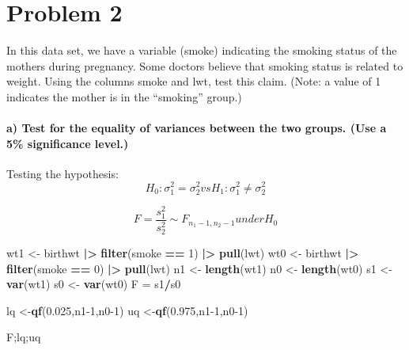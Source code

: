 \documentclass[
]{article}
\newenvironment{Shaded}{\begin{snugshade}}{\end{snugshade}}
\newcommand{\DecValTok}[1]{\textcolor[rgb]{0.00,0.00,0.81}{#1}}
\newcommand{\FloatTok}[1]{\textcolor[rgb]{0.00,0.00,0.81}{#1}}
\newcommand{\FunctionTok}[1]{\textcolor[rgb]{0.13,0.29,0.53}{\textbf{#1}}}
\newcommand{\NormalTok}[1]{#1}
\newcommand{\OtherTok}[1]{\textcolor[rgb]{0.56,0.35,0.01}{#1}}
\newcommand{\SpecialCharTok}[1]{\textcolor[rgb]{0.81,0.36,0.00}{\textbf{#1}}}
\begin{document}
\hypertarget{problem-2}{%
\section{Problem 2}\label{problem-2}}

In this data set, we have a variable (smoke) indicating the smoking
status of the mothers during pregnancy. Some doctors believe that
smoking status is related to weight. Using the columns smoke and lwt,
test this claim. (Note: a value of 1 indicates the mother is in the
``smoking'' group.)

\hypertarget{a-test-for-the-equality-of-variances-between-the-two-groups.-use-a-5-significance-level.}{%
\paragraph{a) Test for the equality of variances between the two groups.
(Use a 5\% significance
level.)}\label{a-test-for-the-equality-of-variances-between-the-two-groups.-use-a-5-significance-level.}}

Testing the hypothesis:
\[H_0 : \sigma_1^2 = \sigma_2^2   vs   H_1 : \sigma_1^2 \neq \sigma_2^2\]

\[F =\frac{s_1^2}{s_2^2}\sim F_{n_1-1,n_2-1}   under H_0\]

\begin{Shaded}
\begin{Highlighting}[]
\NormalTok{wt1 }\OtherTok{\textless{}{-}}\NormalTok{ birthwt }\SpecialCharTok{|\textgreater{}} \FunctionTok{filter}\NormalTok{(smoke }\SpecialCharTok{==} \DecValTok{1}\NormalTok{) }\SpecialCharTok{|\textgreater{}} \FunctionTok{pull}\NormalTok{(lwt)}
\NormalTok{wt0 }\OtherTok{\textless{}{-}}\NormalTok{ birthwt }\SpecialCharTok{|\textgreater{}} \FunctionTok{filter}\NormalTok{(smoke }\SpecialCharTok{==} \DecValTok{0}\NormalTok{) }\SpecialCharTok{|\textgreater{}} \FunctionTok{pull}\NormalTok{(lwt)}
\NormalTok{n1 }\OtherTok{\textless{}{-}} \FunctionTok{length}\NormalTok{(wt1)}
\NormalTok{n0 }\OtherTok{\textless{}{-}} \FunctionTok{length}\NormalTok{(wt0)}
\NormalTok{s1 }\OtherTok{\textless{}{-}} \FunctionTok{var}\NormalTok{(wt1)}
\NormalTok{s0 }\OtherTok{\textless{}{-}} \FunctionTok{var}\NormalTok{(wt0)}
\NormalTok{F }\OtherTok{=}\NormalTok{ s1}\SpecialCharTok{/}\NormalTok{s0}

\NormalTok{lq }\OtherTok{\textless{}{-}}\FunctionTok{qf}\NormalTok{(}\FloatTok{0.025}\NormalTok{,n1}\DecValTok{{-}1}\NormalTok{,n0}\DecValTok{{-}1}\NormalTok{)}
\NormalTok{uq }\OtherTok{\textless{}{-}}\FunctionTok{qf}\NormalTok{(}\FloatTok{0.975}\NormalTok{,n1}\DecValTok{{-}1}\NormalTok{,n0}\DecValTok{{-}1}\NormalTok{)}

\NormalTok{F;lq;uq }
\end{Highlighting}
\end{Shaded}
\end{document}
